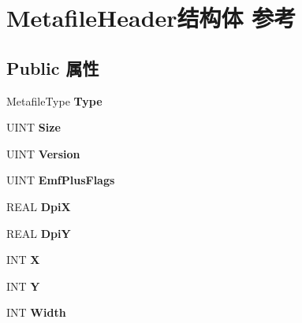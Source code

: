 \hypertarget{struct_metafile_header}{}\section{Metafile\+Header结构体 参考}
\label{struct_metafile_header}
\subsection*{Public 属性}
\begin{DoxyCompactItemize}
\item 
\mbox{\label{struct_metafile_header_a2890baa60e9539ee4187b40964d2553f}} 
Metafile\+Type {\bfseries Type}
\item 
\mbox{\label{struct_metafile_header_af95e285ab42b4e1ba53ed57804561582}} 
U\+I\+NT {\bfseries Size}
\item 
\mbox{\label{struct_metafile_header_adc4aa560e04da9248d8242f594e3bc71}} 
U\+I\+NT {\bfseries Version}
\item 
\mbox{\label{struct_metafile_header_a194087ce8496b78c2f0be9410f2f0b3c}} 
U\+I\+NT {\bfseries Emf\+Plus\+Flags}
\item 
\mbox{\label{struct_metafile_header_a6add6a0f524d89e14b1fe834c5123680}} 
R\+E\+AL {\bfseries DpiX}
\item 
\mbox{\label{struct_metafile_header_a34a80adc5365bf63bafeeff39c15a3ef}} 
R\+E\+AL {\bfseries DpiY}
\item 
\mbox{\label{struct_metafile_header_a7e5e52ed97043eda0d9812e005fcb848}} 
I\+NT {\bfseries X}
\item 
\mbox{\label{struct_metafile_header_ad40676184a90589c97c3aa60b536686e}} 
I\+NT {\bfseries Y}
\item 
\mbox{\label{struct_metafile_header_a308bcf50526803a106f5d8dd1fa09f3c}} 
I\+NT {\bfseries Width}
\item 
\mbox{\label{struct_metafile_header_a3a3de26fd93f844d934b3527fb9116d4}} 

\end{DoxyCompactItemize}
